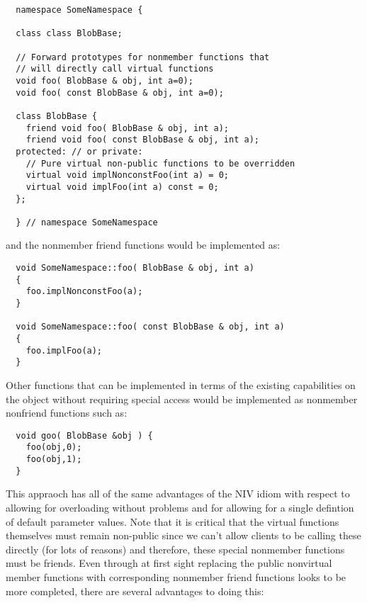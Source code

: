 \documentclass[pdf,ps2pdf,11pt]{SANDreport}
\begin{document}
{\small\begin{verbatim}
  namespace SomeNamespace {

  class class BlobBase;

  // Forward prototypes for nonmember functions that
  // will directly call virtual functions
  void foo( BlobBase & obj, int a=0);
  void foo( const BlobBase & obj, int a=0);

  class BlobBase {
    friend void foo( BlobBase & obj, int a);
    friend void foo( const BlobBase & obj, int a);
  protected: // or private:
    // Pure virtual non-public functions to be overridden
    virtual void implNonconstFoo(int a) = 0;
    virtual void implFoo(int a) const = 0;
  };

  } // namespace SomeNamespace
\end{verbatim}}

{}\noindent{}and the nonmember friend functions would be implemented as:

{\small\begin{verbatim}
  void SomeNamespace::foo( BlobBase & obj, int a)
  {
    foo.implNonconstFoo(a);
  }

  void SomeNamespace::foo( const BlobBase & obj, int a)
  {
    foo.implFoo(a);
  }
\end{verbatim}}

Other functions that can be implemented in terms of the existing capabilities
on the object without requiring special access would be implemented as
nonmember nonfriend functions such as:

{\small\begin{verbatim}
  void goo( BlobBase &obj ) {
    foo(obj,0);
    foo(obj,1);
  }
\end{verbatim}}

This appraoch has all of the same advantages of the NIV idiom with respect to
allowing for overloading without problems and for allowing for a single
defintion of default parameter values.  Note that it is critical that the
virtual functions themselves must remain non-public since we can't allow
clients to be calling these directly (for lots of reasons) and therefore,
these special nonmember functions must be friends.  Even through at first
sight replacing the public nonvirtual member functions with corresponding
nonmember friend functions looks to be more completed, there are several
advantages to doing this:
\end{document}
